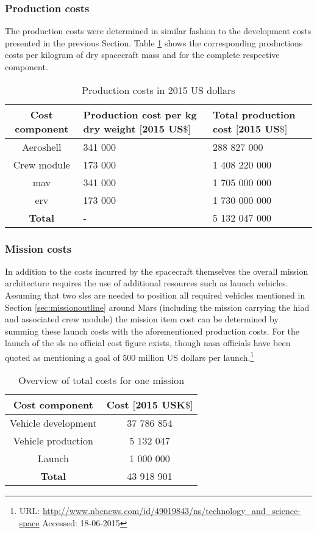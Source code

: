 \subsubsection{Production costs}
The production costs were determined in similar fashion to the development costs presented in the previous Section. Table \ref{tab:productioncosts} shows the corresponding productions costs per kilogram of dry spacecraft mass and for the complete respective component.

\begin{table}[h]
	\centering
	\caption{Production costs in 2015 US dollars}
	\begin{tabular}{|c|p{5cm}|p{5cm}|}
		\hline
		\textbf{Cost component} & \textbf{Production cost per kg dry weight $\mathbf{[2015}$ $\mathbf{US\$]}$} & \textbf{Total production cost $\mathbf{[2015}$ $\mathbf{US\$]}$} \\
		\hline \hline
		Aeroshell & 341 000 & 288 827 000 \\
		Crew module & 173 000 & 1 408 220 000 \\ 
		\acrlong{mav} & 341 000 & 1 705 000 000 \\
		\acrlong{erv} & 173 000 & 1 730 000 000 \\ \hline
		\textbf{Total} & - & 5 132 047 000 \\
		\hline
	\end{tabular}
	\label{tab:productioncosts}
\end{table}

\subsubsection{Mission costs}
In addition to the costs incurred by the spacecraft themselves the overall mission architecture requires the use of additional resources such as launch vehicles. Assuming that two \glspl{sls} are needed to position all required vehicles mentioned in Section \ref{sec:missionoutline} around Mars (including the mission carrying the \gls{hiad} and associated crew module) the mission item cost can be determined by summing these launch costs with the aforementioned production costs. For the launch of the \gls{sls} no official cost figure exists, though \gls{nasa} officials have been quoted as mentioning a goal of $500$ million US dollars per launch.\footnote{URL: \url{http://www.nbcnews.com/id/49019843/ns/technology_and_science-space} Accessed: 18-06-2015}

\begin{table}[H]
	\centering
	\caption{Overview of total costs for one mission}
	\begin{tabular}{|c|c|}
		\hline
		\textbf{Cost component} & \textbf{Cost $\mathbf{[2015}$ $\mathbf{US K\$]}$} \\ \hline 
		\hline
		Vehicle development & 37 786 854 \\
		Vehicle production & 5 132 047\\
		Launch & 1 000 000\\ \hline
		\textbf{Total} & 43 918 901\\ \hline
	\end{tabular}
	\label{tab:missioncosts}
\end{table}


